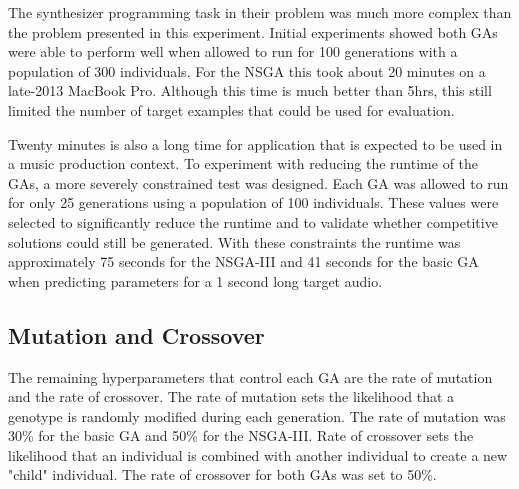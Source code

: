  The synthesizer programming task in their problem was much more complex than the problem presented in this experiment. Initial experiments showed both GAs were able to perform well when allowed to run for 100 generations with a population of 300 individuals. For the NSGA this took about 20 minutes on a late-2013 MacBook Pro. Although this time is much better than 5hrs, this still limited the number of target examples that could be used for evaluation. 
 
 Twenty minutes is also a long time for application that is expected to be used in a music production context. To experiment with reducing the runtime of the GAs, a more severely constrained test was designed. Each GA was allowed to run for only 25 generations using a population of 100 individuals. These values were selected to significantly reduce the runtime and to validate whether competitive solutions could still be generated. With these constraints the runtime was approximately 75 seconds for the NSGA-III and 41 seconds for the basic GA when predicting parameters for a 1 second long target audio.
 
 \subsection{Mutation and Crossover}
 The remaining hyperparameters that control each GA are the rate of mutation and the rate of crossover. The rate of mutation sets the likelihood that a genotype is randomly modified during each generation. The rate of mutation was 30\% for the basic GA and 50\% for the NSGA-III. Rate of crossover sets the likelihood that an individual is combined with another individual to create a new "child" individual. The rate of crossover for both GAs was set to 50\%.





